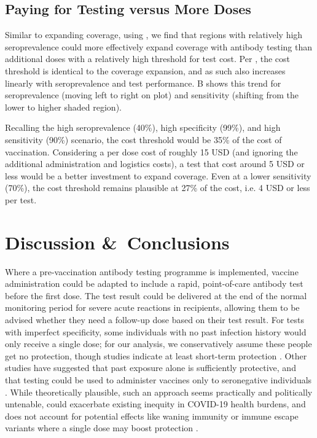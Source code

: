 \documentclass[10pt,a4paper,twocolumn]{article}
\begin{document}
\subsection*{Paying for Testing versus More Doses}

Similar to expanding coverage, using , we find that regions with relatively high seroprevalence could more effectively expand coverage with antibody testing than additional doses with a relatively high threshold for test cost. Per , the cost threshold is identical to the coverage expansion, and as such also increases linearly with seroprevalence and test performance. B shows this trend for seroprevalence (moving left to right on plot) and sensitivity (shifting from the lower to higher shaded region).

Recalling the high seroprevalence (40\%), high specificity (99\%), and high sensitivity (90\%) scenario, the cost threshold would be 35\% of the cost of vaccination. Considering a per dose cost of roughly 15 USD (and ignoring the additional administration and logistics costs), a test that cost around 5 USD or less would be a better investment to expand coverage. Even at a lower sensitivity (70\%), the cost threshold remains plausible at 27\% of the cost, i.e. 4 USD or less per test.

\section*{Discussion \&\ Conclusions}

Where a pre-vaccination antibody testing programme is implemented, vaccine administration could be adapted to include a rapid, point-of-care antibody test before the first dose. The test result could be delivered at the end of the normal monitoring period for severe acute reactions in recipients, allowing them to be advised whether they need a follow-up dose based on their test result. For tests with imperfect specificity, some individuals with no past infection history would only receive a single dose; for our analysis, we conservatively assume these people get no protection, though studies indicate at least short-term protection \cite{krammer_antibody_2021}. Other studies have suggested that past exposure alone is sufficiently protective, and that testing could be used to administer vaccines only to seronegative individuals \cite{bubar_model-informed_2021}. While theoretically plausible, such an approach seems practically and politically untenable, could exacerbate existing inequity in COVID-19 health burdens, and does not account for potential effects like waning immunity or immune escape variants where a single dose may boost protection \cite{stamatatos_mrna_2021, lustig_neutralizing_2021}.
\end{document}
